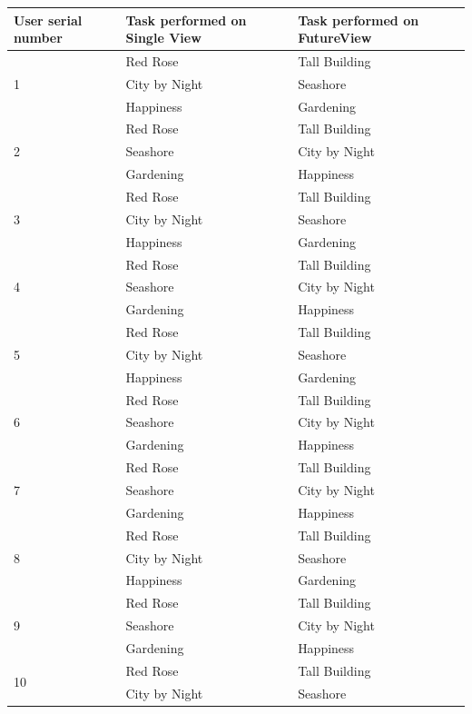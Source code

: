 \documentclass[english]{tktltiki}
\begin{document}
\begin{table}[h]
    \begin{tabular}{ |l|l|l| }
		\hline
		User serial number & Task performed on Single View & Task performed on FutureView \\ 
		\hline
		\multirow{3}{*}{1} & Red Rose & Tall Building \\
 			& City by Night & Seashore \\
 			& Happiness & Gardening \\
 		\hline
 		\multirow{3}{*}{2} & Red Rose & Tall Building \\
 			& Seashore & City by Night \\
 			& Gardening & Happiness \\
 		\hline
		\multirow{3}{*}{3} & Red Rose & Tall Building \\
 			& City by Night & Seashore \\
 			& Happiness & Gardening \\
 		\hline
 		\multirow{3}{*}{4} & Red Rose & Tall Building \\
 			& Seashore & City by Night \\
 			& Gardening & Happiness \\
 		\hline
 		\multirow{3}{*}{5} & Red Rose & Tall Building \\
 			& City by Night & Seashore \\
 			& Happiness & Gardening \\
 		\hline
 		\multirow{3}{*}{6} & Red Rose & Tall Building \\
 			& Seashore & City by Night \\
 			& Gardening & Happiness \\
 		\hline
 		\multirow{3}{*}{7} & Red Rose & Tall Building \\
 			& Seashore & City by Night \\
 			& Gardening & Happiness \\
 		\hline
 		\multirow{3}{*}{8} & Red Rose & Tall Building \\
 			& City by Night & Seashore \\
 			& Happiness & Gardening \\
 		\hline
 		\multirow{3}{*}{9} & Red Rose & Tall Building \\
 			& Seashore & City by Night \\
 			& Gardening & Happiness \\
 		\hline
 		\multirow{3}{*}{10} & Red Rose & Tall Building \\
 			& City by Night & Seashore \\

\end{tabular}
\end{table}
\end{document}
